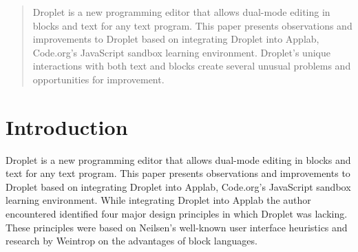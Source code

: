 \documentclass[conference]{IEEEtran}
\begin{document}
\begin{abstract}
Droplet is a new programming editor that allows dual-mode editing in blocks and text for any text program. This paper presents observations and improvements to Droplet based on integrating Droplet into Applab, Code.org's JavaScript sandbox learning environment. Droplet's unique interactions with both text and blocks create several unusual problems and opportunities for improvement.

\end{abstract}





%
\IEEEpeerreviewmaketitle

\section{Introduction}
Droplet \cite{Droplet} is a new programming editor that allows dual-mode editing in blocks and text for any text program. This paper presents observations and improvements to Droplet based on integrating Droplet into Applab, Code.org's \cite{Code.org} JavaScript sandbox learning environment. While integrating Droplet into Applab the author encountered identified four major design principles in which Droplet was lacking. These principles were based on Neilsen's well-known user interface heuristics \cite{Neilsen} and research by Weintrop \cite{Weintrop} on the advantages of block languages.
\end{document}
